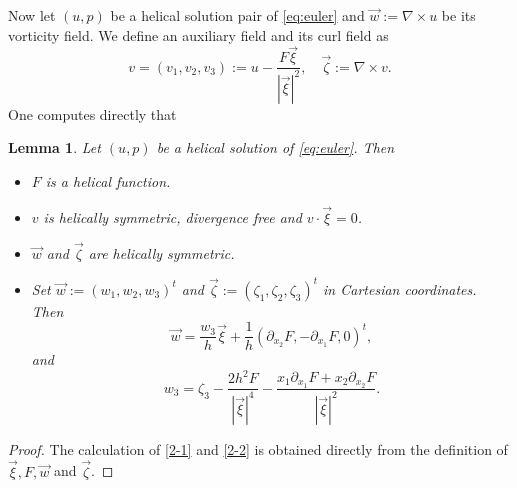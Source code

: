 \documentclass[12pt,reqno]{amsart}
\numberwithin{equation}{section}
\newtheorem{lemma}[theorem]{Lemma}
\theoremstyle{definition}
\theoremstyle{remark}
\newcommand{\Om}{\Omega}
\begin{document}
Now let $  (u, p)  $ be a helical solution pair   of \eqref{eq:euler} and $ \vec{w}:=\nabla\times u $ be its vorticity field. We  define an auxiliary field and its curl field as
\begin{equation}\label{orth field} 
v=(v_1,v_2,v_3):=u-\frac{F\vec{\xi}}{|\vec{\xi}|^2},\quad \vec{\zeta}:=\nabla\times v.
\end{equation}
One computes directly that  
\begin{lemma}\label{lm2-2}
Let $  (u, p)  $ be a helical solution of \eqref{eq:euler}. Then
 \begin{itemize}
 	\item [(a)]  %
 	$F$ is  a helical function.
 	\item [(b)]  %
 	 $v$ is   helically symmetric, divergence free and $ v\cdot \vec{\xi}=0 $.	
 	\item [(c)]  %
 	 $\vec{w}$ and $ \vec{\zeta} $ are  helically symmetric.		
 	\item [(d)]  Set $\vec{w}:=(w_1,w_2,w_3)^t $ and  $\vec{\zeta}:=(\zeta_1,\zeta_2,\zeta_3)^t $ in Cartesian coordinates. %
 	Then 
 	\begin{equation}\label{2-1}
 		\vec{w}=\frac{w_3}{h}\vec{\xi}+\frac{1}{h}(\partial_{x_2}F, -\partial_{x_1}F,0)^t,
 	\end{equation}
 and
 	\begin{equation}\label{2-2}
 		w_3=\zeta_3-\frac{2h^2 F}{|\vec{\xi}|^4}-\frac{x_1 \partial_{x_1}F+x_2\partial_{x_2}F}{|\vec{\xi}|^2}.
 	\end{equation}
 \end{itemize}
 
 
\end{lemma}
 
\begin{proof}
The calculation of \eqref{2-1} and \eqref{2-2} is obtained directly  from the definition of $ \vec{\xi}, F, \vec{w}   $ and $ \vec{\zeta} $.%
\end{proof}
 
\end{document}
